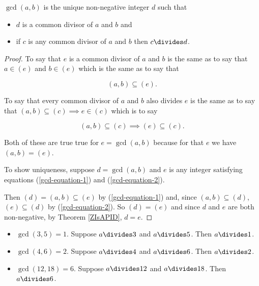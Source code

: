 \documentclass[oneside,12pt]{amsart}
\begin{document}
\begin{lemma}
$\gcd(a,b)$ is the unique non-negative
integer $d$ such that
\begin{itemize}
\item $d$ is a common divisor of $a$ and $b$ and
\item if $c$ is any common divisor of $a$ and $b$ then $c\divides d$.
\end{itemize}
\end{lemma}
\begin{proof}
To say that $e$ is a common divisor of $a$ and $b$ is the same as to say that
$a\in (e)$ and $b\in (e)$ which is the same as to say that

\begin{equation}
\label{gcd-equation-1}
(a,b) \subseteq (e).
\end{equation}

To say that every common divisor of $a$ and $b$ also divides $e$ is the same
as to say that $(a,b) \subseteq (c) \implies e \in (c)$ which is to say

\begin{equation}
\label{gcd-equation-2}
(a,b) \subseteq (c) \implies (e) \subseteq (c).
\end{equation}


Both of these are true true for $e=\gcd(a,b)$ because for that $e$ we have
$(a,b) = (e)$.

To show uniqueness, suppose $d=\gcd(a,b)$ and $e$ is any integer satisfying
equations (\ref{gcd-equation-1}) and (\ref{gcd-equation-2}).

Then $(d) = (a,b) \subseteq (e)$ by (\ref{gcd-equation-1}) and,
since $(a,b) \subseteq (d)$,
$(e) \subseteq (d)$ by (\ref{gcd-equation-2}).
So $(d) = (e)$ and since $d$ and $e$ are both non-negative, by
Theorem \ref{ZIsAPID}, $d=e$.
\end{proof}

\begin{in_class_example}
\quad
\begin{itemize}
\item $\gcd(3,5)=1$. Suppose $a\divides 3$ and $a\divides 5$. Then $a\divides 1$.

\item $\gcd(4,6)=2$. Suppose $a\divides 4$ and $a\divides 6$. Then $a\divides 2$.

\item $\gcd(12,18)=6$. Suppose $a\divides 12$ and $a\divides 18$. Then $a\divides 6$.
\end{itemize}
\end{in_class_example}
\end{document}
